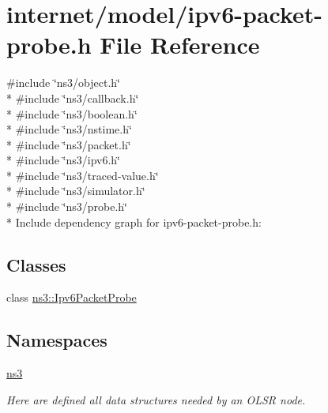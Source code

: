 \hypertarget{ipv6-packet-probe_8h}{}\section{internet/model/ipv6-\/packet-\/probe.h File Reference}
\label{ipv6-packet-probe_8h}
{\ttfamily \#include \char`\"{}ns3/object.\+h\char`\"{}}\\*
{\ttfamily \#include \char`\"{}ns3/callback.\+h\char`\"{}}\\*
{\ttfamily \#include \char`\"{}ns3/boolean.\+h\char`\"{}}\\*
{\ttfamily \#include \char`\"{}ns3/nstime.\+h\char`\"{}}\\*
{\ttfamily \#include \char`\"{}ns3/packet.\+h\char`\"{}}\\*
{\ttfamily \#include \char`\"{}ns3/ipv6.\+h\char`\"{}}\\*
{\ttfamily \#include \char`\"{}ns3/traced-\/value.\+h\char`\"{}}\\*
{\ttfamily \#include \char`\"{}ns3/simulator.\+h\char`\"{}}\\*
{\ttfamily \#include \char`\"{}ns3/probe.\+h\char`\"{}}\\*
Include dependency graph for ipv6-\/packet-\/probe.h\+:
\subsection*{Classes}
\begin{DoxyCompactItemize}
\item 
class \hyperlink{classns3_1_1Ipv6PacketProbe}{ns3\+::\+Ipv6\+Packet\+Probe}
\end{DoxyCompactItemize}
\subsection*{Namespaces}
\begin{DoxyCompactItemize}
\item 
 \hyperlink{namespacens3}{ns3}
\begin{DoxyCompactList}\small\item\em Here are defined all data structures needed by an O\+L\+SR node. \end{DoxyCompactList}\end{DoxyCompactItemize}

